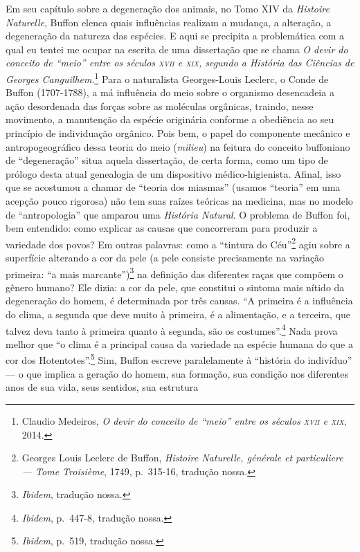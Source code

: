 Em seu capítulo sobre a degeneração dos animais, no Tomo XIV da
\textit{Histoire Naturelle}, Buffon elenca quais influências realizam a
mudança, a alteração, a degeneração da natureza das espécies. E aqui se
precipita a problemática com a qual eu tentei me ocupar na escrita de
uma dissertação que se chama \textit{O devir do conceito de ``meio'' entre
os séculos \textsc{xvii} e \textsc{xix}, segundo a História das Ciências de Georges
Canguilhem}.\footnote{Claudio Medeiros, \textit{O devir do conceito de
  ``meio'' entre os séculos \textsc{xvii} e \textsc{xix}}, 2014.} Para o naturalista
Georges-Louis Leclerc, o Conde de Buffon (1707-1788), a má influência do
meio sobre o organismo desencadeia a ação desordenada das forças sobre
as moléculas orgânicas, traindo, nesse movimento, a manutenção da
espécie originária conforme a obediência ao seu princípio de
individuação orgânico. Pois bem, o papel do componente mecânico e
antropogeográfico dessa teoria do meio (\textit{milieu}) na feitura do
conceito buffoniano de ``degeneração'' situa aquela dissertação, de
certa forma, como um tipo de prólogo desta atual genealogia de um
dispositivo médico-higienista. Afinal, isso que se acostumou a chamar de
``teoria dos miasmas'' (usamos ``teoria'' em uma acepção pouco rigorosa)
não tem suas raízes teóricas na medicina, mas no modelo de
``antropologia'' que amparou uma \textit{História Natural}. O problema de
Buffon foi, bem entendido: como explicar as causas que concorreram para
produzir a variedade dos povos? Em outras palavras: como a ``tintura do
Céu''\footnote{Georges Louis Leclerc de Buffon, \textit{Histoire
  Naturelle, générale et particuliere --- Tome Troisième}, 1749,
  p.~315-16, tradução nossa.} agiu sobre a superfície alterando a cor da
pele (a pele consiste precisamente na variação primeira: ``a mais
marcante'')\footnote{\textit{Ibidem}, tradução nossa.} na definição das
diferentes raças que compõem o gênero humano? Ele dizia: a cor da pele,
que constitui o sintoma mais nítido da degeneração do homem, é
determinada por três causas. ``A primeira é a influência do clima, a
segunda que deve muito à primeira, é a alimentação, e a terceira, que
talvez deva tanto à primeira quanto à segunda, são os
costumes''.\footnote{\textit{Ibidem}, p.~447-8, tradução nossa.} Nada
prova melhor que ``o clima é a principal causa da variedade na espécie
humana do que a cor dos Hotentotes''.\footnote{\textit{Ibidem}, p.~519,
  tradução nossa.} Sim, Buffon escreve paralelamente à ``história do
indivíduo'' --- o que implica a geração do homem, sua formação, sua
condição nos diferentes anos de sua vida, seus sentidos, sua estrutura
